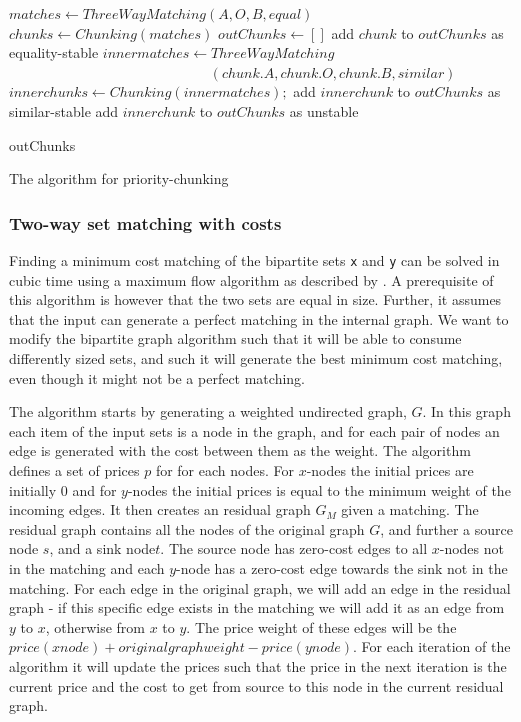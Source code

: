 \documentclass[11pt]{article}
\begin{document}
\begin{algorithm}
\begin{algorithmic}
	\State $matches \gets ThreeWayMatching(A, O, B, equal)$
	\State $chunks \gets Chunking(matches)$
	\State $outChunks \gets []$
			\State add $chunk$ to $outChunks$ as equality-stable
		\Else
			\State $innermatches \gets ThreeWayMatching $
			\State ~~~~~~~~~~~~~~~~~~~~~~~~~~~~ $ (chunk.A, chunk.O, chunk.B, similar)$
            \State $innerchunks \gets Chunking(innermatches);$
					\State add $innerchunk$ to $outChunks$ as similar-stable
				\Else
					\State add $innerchunk$ to $outChunks$ as unstable
				\EndIf
			\EndFor
		\EndIf
	\EndFor


	\State \Return outChunks
\EndFunction
\end{algorithmic}
	\caption{The algorithm for priority-chunking}
	\label{PriorityChunk}
\end{algorithm}


\subsubsection{Two-way set matching with costs}
Finding a minimum cost matching of the bipartite sets \texttt{x} and \texttt{y} can be solved in cubic time using a maximum flow algorithm as described by \citet{bipartitecost}. A prerequisite of this algorithm is however that the two sets are equal in size. Further, it assumes that the input can generate a perfect matching in the internal graph. We want to modify the bipartite graph algorithm such that it will be able to consume differently sized sets, and such it will generate the best minimum cost matching, even though it might not be a perfect matching.

The \citet{bipartitecost} algorithm starts by generating a weighted undirected graph, $G$. In this graph each item of the input sets is a node in the graph, and for each pair of nodes an edge is generated with the cost between them as the weight. The algorithm defines a set of prices $p$ for for each nodes. For $x$-nodes the initial prices are initially 0 and for $y$-nodes the initial prices is equal to the minimum weight of the incoming edges. It then creates an residual graph $G_M$ given a matching. The residual graph contains all the nodes of the original graph $G$, and further a source node $s$, and a sink node$t$. The source node has zero-cost edges to all $x$-nodes not in the matching and each $y$-node has a zero-cost edge towards the sink not in the matching. For each edge in the original graph, we will add an edge in the residual graph - if this specific edge exists in the matching we will add it as an edge from $y$ to $x$, otherwise from $x$ to $y$. The price weight of these edges will be the $price(xnode)+originalgraphweight-price(ynode)$. For each iteration of the algorithm it will update the prices such that the price in the next iteration is the current price and the cost to get from source to this node in the current residual graph.
\end{document}
